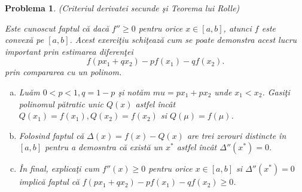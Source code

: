 \documentclass[a4paper,12pt,oneside]{report}
\newtheorem{problem}{Problema}
\begin{document}
\begin{problem} (Criteriul derivatei secunde \c{s}i Teorema lui Rolle)
	
Este cunoscut faptul c\u{a} dac\u{a} \({f}'' \geq 0\) pentru orice \(x\in \left [ a,b \right ]\), atunci \(f\) este convex\u{a} pe \(\left [ a,b \right ]\). Acest exerci\c{t}iu schi\c{t}eaz\u{a} cum se poate demonstra acest lucru important prin estimarea diferen\c{t}ei
\begin{displaymath}
  f\left ( px_{1} + qx_{2}\right ) - pf\left ( x_{1} \right ) - qf\left ( x_{2} \right ).
\end{displaymath}
 prin compararea cu un polinom.
 \begin{enumerate}[a)]
\item Lu\u{a}m \(0< p < 1, q = 1-p\) \c{s}i not\u{a}m \(mu = px_{1} + px_{2}\) unde \(x_{1} < x_{2}\).  Gasi\c{t}i polinomul p\u{a}tratic unic \(Q\left ( x \right )\) astfel \^{i}nc\^{a}t  \(Q\left ( x_{1} \right ) = f\left ( x_{1} \right ), Q\left ( x_{2} \right ) = f\left ( x_{2} \right )\) si \(Q\left ( \mu  \right ) = f\left ( \mu  \right )\).
\item Folosind faptul c\u{a} \(\Delta \left ( x \right ) =  f\left ( x \right ) - Q\left ( x \right )\) are trei zerouri distincte \^{i}n \(\left [ a,b \right ]\) pentru a demosntra c\u{a} exist\u{a} un \(x^{*}\) astfel \^{i}nc\^{a}t \({\Delta }''\left ( x^{*} \right ) = 0\).
\item \^{I}n final, explica\c{t}i cum \({f}''\left ( x \right ) \geq 0\) pentru orice \(x\in \left [ a,b \right ]\) si \({\Delta }''\left ( x^{*} \right ) = 0\) implic\u{a} faptul c\u{a} \(f\left ( px_{1} + qx_{2} \right ) - pf\left ( x_{1} \right ) - qf\left ( x_{2} \right ) \geq 0\).
\end{enumerate}
\end{problem}
\end{document}
